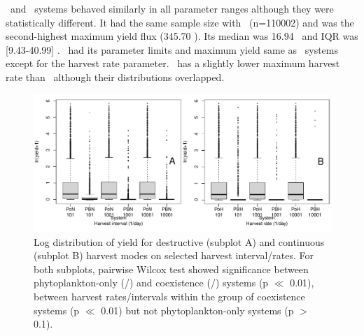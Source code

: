 \documentclass[../thesis.tex]{subfiles} %
\begin{document}
\PoN\ and \PoH\ systems behaved similarly in all parameter ranges although they were statistically different.  It had the same sample size with \PoH\ (n=110002) and was the second-highest maximum yield flux (345.70 \dxdt).  Its median was 16.94 \dxdt\ and IQR was [9.43-40.99] \dxdt.  \PoN\ had its parameter limits and maximum yield same as \PoH\ systems except for the harvest rate parameter.  \PoN\ has a slightly lower maximum harvest rate than \PoH\ although their distributions overlapped.

\begin{figure}[H]
    \centering
    \includegraphics[width=\linewidth]{result/Harvest.pdf}
    \caption[Yield flux distribution by harvest mode]{Log distribution of yield for destructive (subplot A) and continuous (subplot B) harvest modes on selected harvest interval/rates.  For both subplots, pairwise Wilcox test showed significance between phytoplankton-only (\PoH/\PoN) and coexistence (\PBH/\PBN) systems (p $\ll$ 0.01), between harvest rates/intervals within the group of coexistence systems (p $\ll$ 0.01) but not phytoplankton-only systems (p $>$ 0.1).}
    \label{f:ydByHarv}
\end{figure}
\end{document}
